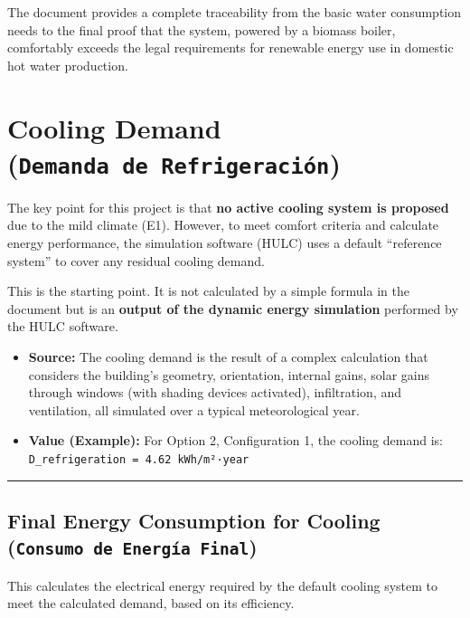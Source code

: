 \documentclass[
  10pt,
  letterpaper,
]{scrbook}
\providecommand{\tightlist}{%
  \setlength{\itemsep}{0pt}\setlength{\parskip}{0pt}}
\begin{document}
The document provides a complete traceability from the basic water
consumption needs to the final proof that the system, powered by a
biomass boiler, comfortably exceeds the legal requirements for renewable
energy use in domestic hot water production.


\chapter{\texorpdfstring{Cooling Demand
(\texttt{Demanda\ de\ Refrigeración})}{Cooling Demand (Demanda de Refrigeración)}}\label{cooling-demand-demanda-de-refrigeraciuxf3n}

The key point for this project is that \textbf{no active cooling system
is proposed} due to the mild climate (E1). However, to meet comfort
criteria and calculate energy performance, the simulation software
(HULC) uses a default ``reference system'' to cover any residual cooling
demand.

This is the starting point. It is not calculated by a simple formula in
the document but is an \textbf{output of the dynamic energy simulation}
performed by the HULC software.

\begin{itemize}
\tightlist
\item
  \textbf{Source:} The cooling demand is the result of a complex
  calculation that considers the building's geometry, orientation,
  internal gains, solar gains through windows (with shading devices
  activated), infiltration, and ventilation, all simulated over a
  typical meteorological year.
\item
  \textbf{Value (Example):} For Option 2, Configuration 1, the cooling
  demand is: \texttt{D\_refrigeration\ =\ 4.62\ kWh/m²·year}
\end{itemize}

\begin{center}\rule{0.5\linewidth}{0.5pt}\end{center}

\section{\texorpdfstring{Final Energy Consumption for Cooling
(\texttt{Consumo\ de\ Energía\ Final})}{Final Energy Consumption for Cooling (Consumo de Energía Final)}}\label{final-energy-consumption-for-cooling-consumo-de-energuxeda-final}

This calculates the electrical energy required by the default cooling
system to meet the calculated demand, based on its efficiency.
\end{document}
